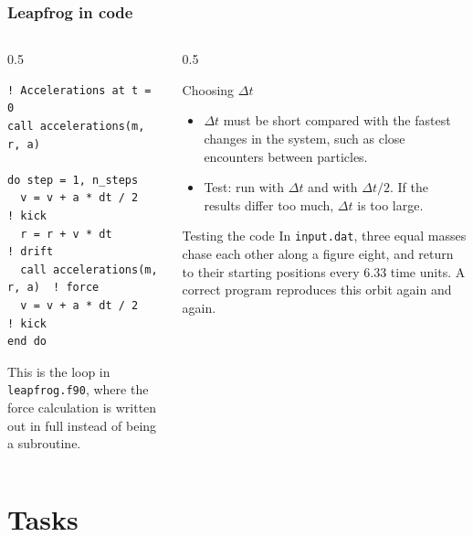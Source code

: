 \begin{frame}[fragile]
  \frametitle{Leapfrog in code}
  \begin{columns}[T]
    \begin{column}{0.5\textwidth}
      \begin{lstlisting}
! Accelerations at t = 0
call accelerations(m, r, a)

do step = 1, n_steps
  v = v + a * dt / 2           ! kick
  r = r + v * dt               ! drift
  call accelerations(m, r, a)  ! force
  v = v + a * dt / 2           ! kick
end do
      \end{lstlisting}
      This is the loop in \texttt{leapfrog.f90}, where the force calculation is written out in full instead of being a subroutine.
    \end{column}

    \begin{column}{0.5\textwidth}
      \begin{block}{Choosing $\Delta t$}
        \begin{itemize}
          \item $\Delta t$ must be short compared with the fastest changes in the system, such as close encounters between particles.
          \item Test: run with $\Delta t$ and with $\Delta t / 2$. If the results differ too much, $\Delta t$ is too large.
        \end{itemize}
      \end{block}
      \begin{block}{Testing the code}
        In \texttt{input.dat}, three equal masses chase each other along a figure eight, and return to their starting positions every 6.33 time units. A correct program reproduces this orbit again and again.
      \end{block}
    \end{column}
  \end{columns}
\end{frame}


\section{Tasks}

